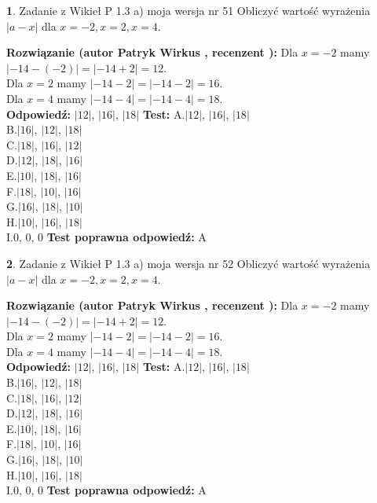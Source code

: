\documentclass[12pt, a4paper]{article}
\theoremstyle{definition} %
\newtheorem{zad}{}
\newcommand{\zadStart}[1]{\begin{zad}#1\newline}
\newcommand{\zadStop}{\end{zad}}
\newcommand{\rozwStart}[2]{\noindent \textbf{Rozwiązanie (autor #1 , recenzent #2): }\newline}
\newcommand{\rozwStop}{\newline}
\newcommand{\odpStart}{\noindent \textbf{Odpowiedź:}\newline}
\newcommand{\odpStop}{\newline}
\newcommand{\testStart}{\noindent \textbf{Test:}\newline}
\newcommand{\testStop}{\newline}
\newcommand{\kluczStart}{\noindent \textbf{Test poprawna odpowiedź:}\newline}
\newcommand{\kluczStop}{\newline}
\begin{document}
\zadStart{Zadanie z Wikieł P 1.3 a) moja wersja nr 51}
Obliczyć wartość wyrażenia $|a - x|$ dla $x=-2,x=2,x=4$.
\zadStop
\rozwStart{Patryk Wirkus}{}
Dla $x = -2$ mamy $|-14 - (-2)| = |-14 + 2| = 12$.\\
Dla $x = 2$ mamy $|-14 - 2| = |-14 - 2| = 16$.\\
Dla $x = 4$ mamy $|-14 - 4| = |-14 - 4| = 18$.\\
\rozwStop
\odpStart
$|12|$, $|16|$, $|18|$
\odpStop
\testStart
A.$|12|$, $|16|$, $|18|$\\
B.$|16|$, $|12|$, $|18|$\\
C.$|18|$, $|16|$, $|12|$\\
D.$|12|$, $|18|$, $|16|$\\
E.$|10|$, $|18|$, $|16|$\\
F.$|18|$, $|10|$, $|16|$\\
G.$|16|$, $|18|$, $|10|$\\
H.$|10|$, $|16|$, $|18|$\\
I.$0$, $0$, $0$
\testStop
\kluczStart
A
\kluczStop



\zadStart{Zadanie z Wikieł P 1.3 a) moja wersja nr 52}
Obliczyć wartość wyrażenia $|a - x|$ dla $x=-2,x=2,x=4$.
\zadStop
\rozwStart{Patryk Wirkus}{}
Dla $x = -2$ mamy $|-14 - (-2)| = |-14 + 2| = 12$.\\
Dla $x = 2$ mamy $|-14 - 2| = |-14 - 2| = 16$.\\
Dla $x = 4$ mamy $|-14 - 4| = |-14 - 4| = 18$.\\
\rozwStop
\odpStart
$|12|$, $|16|$, $|18|$
\odpStop
\testStart
A.$|12|$, $|16|$, $|18|$\\
B.$|16|$, $|12|$, $|18|$\\
C.$|18|$, $|16|$, $|12|$\\
D.$|12|$, $|18|$, $|16|$\\
E.$|10|$, $|18|$, $|16|$\\
F.$|18|$, $|10|$, $|16|$\\
G.$|16|$, $|18|$, $|10|$\\
H.$|10|$, $|16|$, $|18|$\\
I.$0$, $0$, $0$
\testStop
\kluczStart
A
\kluczStop
\end{document}

